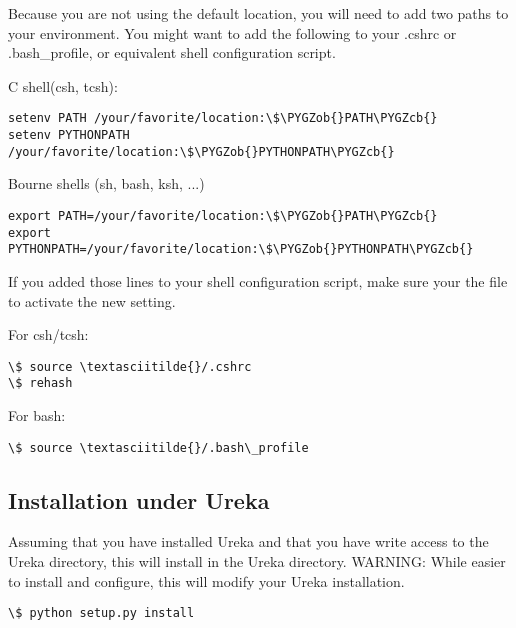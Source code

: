 \documentclass[letterpaper,10pt,english]{sphinxmanual}
\def\PYGZob{\char`\{}
\def\PYGZcb{\char`\}}
\begin{document}
Because you are not using the default location, you will need to add two paths to
your environment.  You might want to add the following to your .cshrc or
.bash\_profile, or equivalent shell configuration script.

C shell(csh, tcsh):

\begin{Verbatim}[commandchars=\\\{\}]
setenv PATH /your/favorite/location:\$\PYGZob{}PATH\PYGZcb{}
setenv PYTHONPATH /your/favorite/location:\$\PYGZob{}PYTHONPATH\PYGZcb{}
\end{Verbatim}

Bourne shells (sh, bash, ksh, ...)

\begin{Verbatim}[commandchars=\\\{\}]
export PATH=/your/favorite/location:\$\PYGZob{}PATH\PYGZcb{}
export PYTHONPATH=/your/favorite/location:\$\PYGZob{}PYTHONPATH\PYGZcb{}
\end{Verbatim}

If you added those lines to your shell configuration script, make sure your
 the file to activate the new setting.

For csh/tcsh:

\begin{Verbatim}[commandchars=\\\{\}]
\$ source \textasciitilde{}/.cshrc
\$ rehash
\end{Verbatim}

For bash:

\begin{Verbatim}[commandchars=\\\{\}]
\$ source \textasciitilde{}/.bash\_profile
\end{Verbatim}


\subsection{Installation under Ureka}
\label{userenv:installation-under-ureka}
Assuming that you have installed Ureka and that you have write access to the Ureka
directory, this will install  in the Ureka  directory.
WARNING: While easier to install and configure, this will modify your Ureka
installation.

\begin{Verbatim}[commandchars=\\\{\}]
\$ python setup.py install
\end{Verbatim}
\end{document}
